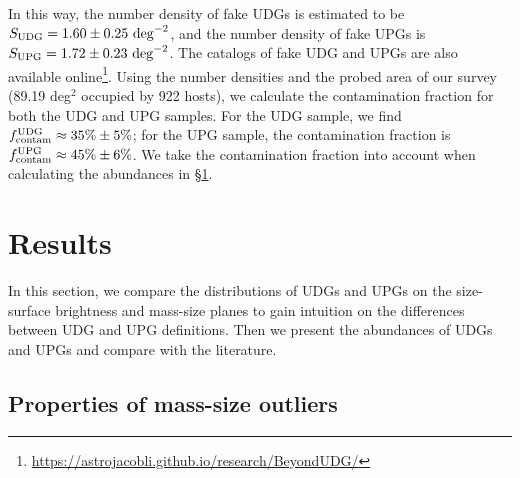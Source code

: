 \documentclass[twocolumn,astrosymb,twocolappendix]{aastex631}
\begin{document}
\begin{CJK*}{UTF8}{gbsn}
In this way, the number density of fake UDGs is estimated to be $S_{\rm UDG} = 1.60\pm0.25\ \mathrm{deg}^{-2}$, and the number density of fake UPGs is $S_{\rm UPG} = 1.72\pm0.23\ \mathrm{deg}^{-2}$. The catalogs of fake UDG and UPGs are also available online\footnote{\url{https://astrojacobli.github.io/research/BeyondUDG/}}. Using the number densities and the probed area of our survey (89.19 deg$^{2}$ occupied by 922 hosts), we calculate the contamination fraction for both the UDG and UPG samples. For the UDG sample, we find $f_{\rm contam}^{\rm UDG} \approx 35\%\pm5\%$; for the UPG sample, the contamination fraction is $f_{\rm contam}^{\rm UPG} \approx 45\%\pm6\%$. We take the contamination fraction into account when calculating the abundances in \S\ref{sec:results}.


\section{Results}\label{sec:results}
In this section, we compare the distributions of UDGs and UPGs on the size-surface brightness and mass-size planes to gain intuition on the differences between UDG and UPG definitions. Then we present the abundances of UDGs and UPGs and compare with the literature. 

\subsection{Properties of mass-size outliers}\label{sec:mass-size}


\end{CJK*}
\end{document}
